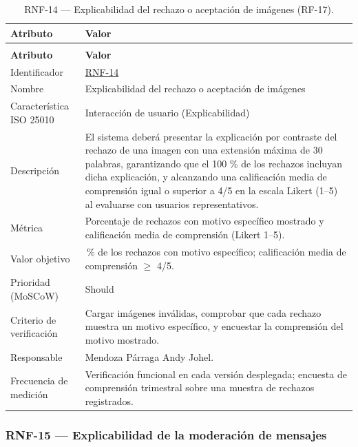 \documentclass[journal,onecolumn]{IEEEtran}
\makeatletter
\newenvironment{atributos}[2]{%
	\small
	\begin{longtable}{@{}>{\raggedright\arraybackslash}p{4.2cm} >{\raggedright\arraybackslash}p{11.2cm}@{}}
		\caption{#2}\label{tab:#1}\\
		\toprule
		\textbf{Atributo} & \textbf{Valor} \\
		\midrule
		\endfirsthead
		\multicolumn{2}{@{}l}{\small\itshape (continuación)}\\
		\toprule
		\textbf{Atributo} & \textbf{Valor} \\
		\midrule
		\endhead
		\bottomrule
		\endlastfoot
	}{%
	\end{longtable}
	\normalsize
}
\makeatother
\begin{document}
	\begin{atributos}{RNF-14}{RNF-14 --- Explicabilidad del rechazo o aceptación de imágenes (RF-17).}
		Identificador & \hyperref[tab:RNF-14]{RNF-14} \\
		Nombre & Explicabilidad del rechazo o aceptación de imágenes \\
		Característica ISO 25010 & Interacción de usuario (Explicabilidad) \\
		Descripción & El sistema deberá presentar la explicación por contraste del rechazo de una imagen con una extensión máxima de 30 palabras, garantizando que el 100 \% de los rechazos incluyan dicha explicación, y alcanzando una calificación media de comprensión igual o superior a 4/5 en la escala Likert (1–5) al evaluarse con usuarios representativos. \\
		Métrica & Porcentaje de rechazos con motivo específico mostrado y calificación media de comprensión (Likert 1--5). \\
		Valor objetivo & 100\,\% de los rechazos con motivo específico; calificación media de comprensión $\geq$ 4/5. \\
		Prioridad (MoSCoW) & Should \\
		Criterio de verificación & Cargar imágenes inválidas, comprobar que cada rechazo muestra un motivo específico, y encuestar la comprensión del motivo mostrado. \\
		Responsable & Mendoza Párraga Andy Johel. \\
		Frecuencia de medición & Verificación funcional en cada versión desplegada; encuesta de comprensión trimestral sobre una muestra de rechazos registrados. \\
	\end{atributos}
	
	\subsubsection{RNF-15 --- Explicabilidad de la moderación de mensajes}
	
\end{document}
